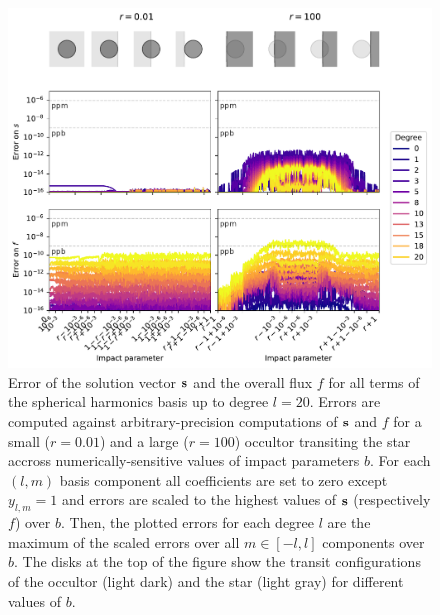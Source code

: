 \documentclass[modern]{aastex631}
\begin{document}
\begin{figure}[H]
    \begin{center}
        \includegraphics[width=\textwidth]{../workflows/precision/figures/error_jax.pdf}
        \caption{Error of the solution vector ${\mathbf{s}}$ and the overall flux $f$ for all terms of the spherical harmonics basis up to degree $l=20$. Errors are computed against arbitrary-precision computations of ${\mathbf{s}}$ and $f$ for a small ($r=0.01$) and a large ($r=100$) occultor transiting the star accross numerically-sensitive values of impact parameters $b$. For each $(l, m)$ basis component all coefficients are set to zero except $y_{l,m}=1$ and errors are scaled to the highest values of ${\mathbf{s}}$ (respectively $f$) over $b$. Then, the plotted errors for each degree $l$ are the maximum of the scaled errors over all $m\in [-l, l]$ components over $b$. The disks at the top of the figure show the transit configurations of the occultor (light dark) and the star (light gray) for different values of $b$. }
        \label{fig:precision_s}
    \end{center}
\end{figure}
\end{document}
